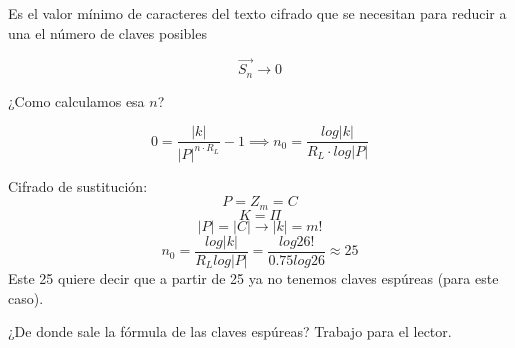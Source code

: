 \begin{defn}
	
Es el valor mínimo de caracteres del texto cifrado que se necesitan para reducir a una el número de claves posibles

$$\overrightarrow{S_n} \rightarrow 0$$

¿Como calculamos esa $n$?

$$0 = \frac{|k|}{|P|^{n \cdot R_L}} -1 \implies n_0 = \frac{log|k|}{R_L\cdot log|P|}$$ 
\end{defn}


\begin{example}
	Cifrado de sustitución:
	$$P= Z_m = C$$
	$$K = \Pi$$
	$$|P|=|C| \rightarrow |k| = m!$$
	$$n_0 = \frac{log|k|}{R_L log|P|} = \frac{log 26!}{0.75 log 26} \approx 25$$
	Este 25 quiere decir que a partir de 25 ya no tenemos claves espúreas (para este caso).
\end{example}

¿De donde sale la fórmula de las claves espúreas? Trabajo para el lector.
